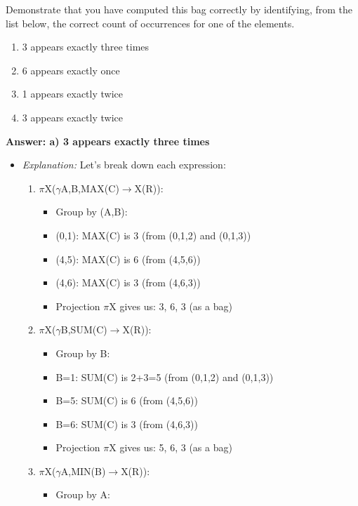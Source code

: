 \documentclass{article}
\begin{document}
\begin{enumerate}[label=\textbf{Question \arabic*.}]
    Demonstrate that you have computed this bag correctly by identifying, from the list below, the correct count of occurrences for one of the elements.
    \begin{enumerate}[label=\alph*)]
        \item 3 appears exactly three times
        \item 6 appears exactly once
        \item 1 appears exactly twice
        \item 3 appears exactly twice
    \end{enumerate}
    \textbf{Answer: a) 3 appears exactly three times}
    \begin{itemize}
        \item \textit{Explanation:} Let's break down each expression:
        \begin{enumerate}
            \item $\pi$X($\gamma$A,B,MAX(C)$\rightarrow$X(R)):
                \begin{itemize}
                    \item Group by (A,B):
                        \item (0,1): MAX(C) is 3 (from (0,1,2) and (0,1,3))
                        \item (4,5): MAX(C) is 6 (from (4,5,6))
                        \item (4,6): MAX(C) is 3 (from (4,6,3))
                    \item Projection $\pi$X gives us: {3, 6, 3} (as a bag)
                \end{itemize}
            \item $\pi$X($\gamma$B,SUM(C)$\rightarrow$X(R)):
                \begin{itemize}
                    \item Group by B:
                        \item B=1: SUM(C) is 2+3=5 (from (0,1,2) and (0,1,3))
                        \item B=5: SUM(C) is 6 (from (4,5,6))
                        \item B=6: SUM(C) is 3 (from (4,6,3))
                    \item Projection $\pi$X gives us: {5, 6, 3} (as a bag)
                \end{itemize}
            \item $\pi$X($\gamma$A,MIN(B)$\rightarrow$X(R)):
                \begin{itemize}
                    \item Group by A:

\end{itemize}
\end{enumerate}
\end{itemize}
\end{enumerate}
\end{document}
